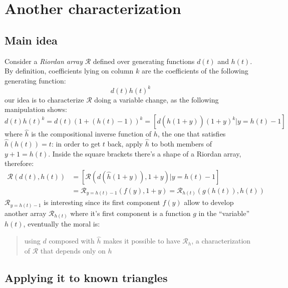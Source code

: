 \documentclass[11pt,a4paper]{article} %
\begin{document}
    \section{Another characterization}

    \subsection{Main idea}

    Consider a \emph{Riordan array} $\mathcal{R}$ defined over generating
    functions $d(t)$ and $h(t)$. By definition, coefficients lying on 
    column $k$ are the coefficients of the following generating function:
    \begin{displaymath}
        d(t)h(t)^k
    \end{displaymath}
    our idea is to characterize $\mathcal{R}$ doing a variable change, as the
    following manipulation shows:
    \begin{displaymath}
        d(t)h(t)^k = d(t)(1 + (h(t)-1))^k = \left[ d(\hat{h}(1+y))(1+y)^k \left| y = h(t)-1 \right. \right]
    \end{displaymath}
    where $\hat{h}$ is the compositional inverse function of $h$, the one that
    satisfies $\hat{h}(h(t)) = t$: in order to get $t$ back, apply $\hat{h}$ to
    both members of $y+1 = h(t)$.
    Inside the square brackets there's a shape of a Riordan array, therefore:
    \begin{displaymath}
        \begin{split}
            \mathcal{R}\left(d(t),h(t)\right) &= \left[ \mathcal{R}\left(d(\hat{h}(1+y)), 1+y\right) \left| y = h(t)-1 \right. \right]\\
            &= \mathcal{R}_{y=h(t)-1}\left( f(y), 1+y \right) =  \mathcal{R}_{h(t)}\left( g(h(t)), h(t) \right) 
        \end{split}
    \end{displaymath}
    $\mathcal{R}_{y=h(t)-1}$ is interesting since its first component $f(y)$ allow to 
    develop another array $\mathcal{R}_{h(t)}$ where it's first component
    is a function $g$ in the ``variable'' $h(t)$, eventually the moral is:
    \begin{verse}
        using $d$ composed with $\hat{h}$ makes it possible to have $\mathcal{R}_{h}$,
        a characterization of $\mathcal{R}$ that depends only on $h$
    \end{verse}

    \subsection{Applying it to known triangles}
\end{document}
